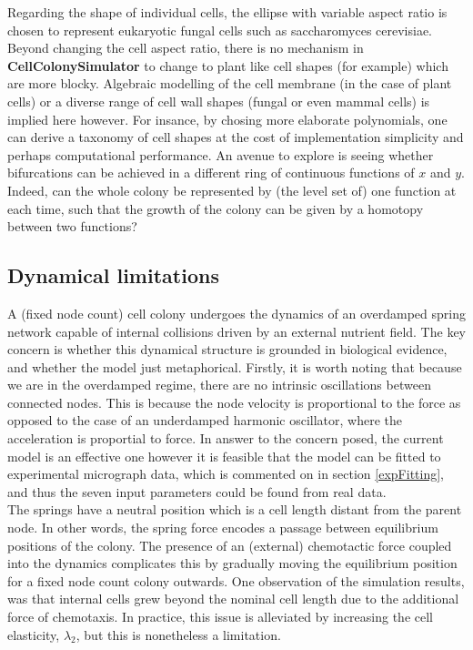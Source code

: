 Regarding the shape of individual cells, 
the ellipse with variable aspect ratio is chosen to represent eukaryotic
fungal cells such as saccharomyces cerevisiae. Beyond changing 
the cell aspect ratio, there is no mechanism in \textbf{CellColonySimulator}
to change to plant like cell shapes (for example) which are more blocky.
Algebraic modelling of the cell membrane (in the case of plant cells) or
a diverse range of cell wall shapes (fungal or even mammal cells)
is implied here however. For insance, by chosing more elaborate
polynomials, one can derive a taxonomy of cell shapes at the cost of 
implementation simplicity and perhaps computational performance. 
An avenue to explore is seeing whether bifurcations
can be achieved in a different ring of continuous functions of $x$ and $y$.
Indeed, can the whole colony be represented by (the level set of) one function at each time,
such that the growth of the colony can be given by a homotopy 
between two functions?
\\

\subsection{Dynamical limitations}
A (fixed node count) cell colony undergoes the dynamics of an overdamped spring network capable
of internal collisions driven by
an external nutrient field. The key concern is whether this dynamical structure is grounded in 
biological evidence, and whether the model just metaphorical. Firstly, 
it is worth noting that because we are in the overdamped regime,
there are no intrinsic oscillations between connected nodes. This is because the node velocity 
is proportional to the force as opposed to the case 
of an underdamped harmonic oscillator, where the acceleration is proportial to force.
In answer to the concern posed, the current model is an effective one however
it is feasible that the model can be fitted to experimental micrograph data, 
which is commented on in section \ref{expFitting}, and thus the seven input parameters 
could be found from real data.
\\

The springs have a neutral position which is a cell length distant from the parent node.
In other words, the spring force encodes a passage between equilibrium positions of the colony.
The presence of an (external) chemotactic force coupled into the dynamics complicates 
this by gradually moving the equilibrium position for a fixed node count colony outwards.
One observation of the simulation results, was that internal cells grew beyond the nominal cell length
due to the additional force of chemotaxis. In practice,
this issue is alleviated by increasing the cell elasticity, $\lambda_2$, but this 
is nonetheless a limitation.
\\

